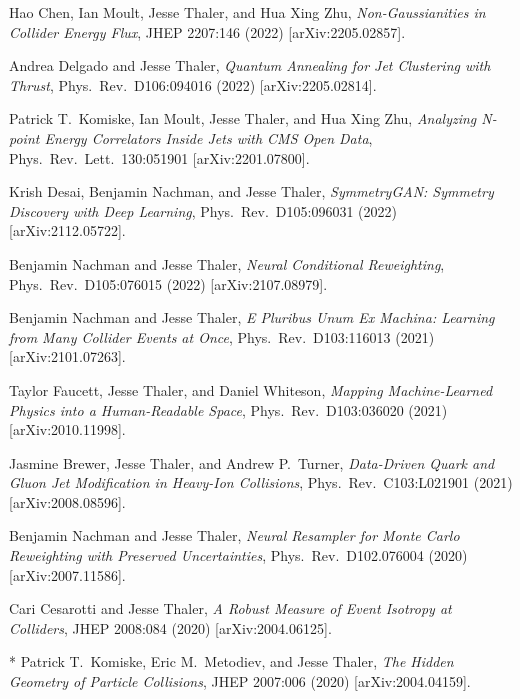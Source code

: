 \begin{list}{[]\addtocounter{jessecount}{-1}}{\leftmargin=3em \itemsep=4pt}
\item
 Hao Chen, Ian Moult, Jesse Thaler, and Hua Xing Zhu,
\emph{Non-Gaussianities in Collider Energy Flux},
JHEP 2207:146 (2022)
[arXiv:2205.02857].

\item
 Andrea Delgado and Jesse Thaler,
\emph{Quantum Annealing for Jet Clustering with Thrust},
Phys.\ Rev.\ D106:094016 (2022)
[arXiv:2205.02814].

\item
 Patrick T.\ Komiske, Ian Moult, Jesse Thaler, and Hua Xing Zhu,
\emph{Analyzing N-point Energy Correlators Inside Jets with CMS Open Data},
Phys.\ Rev.\ Lett.\ 130:051901
[arXiv:2201.07800].

\item
 Krish Desai, Benjamin Nachman, and Jesse Thaler,
\emph{SymmetryGAN: Symmetry Discovery with Deep Learning},
Phys.\ Rev.\ D105:096031 (2022)
[arXiv:2112.05722].

\item
 Benjamin Nachman and Jesse Thaler,
\emph{Neural Conditional Reweighting},
Phys.\ Rev.\ D105:076015 (2022)
[arXiv:2107.08979].

\item
 Benjamin Nachman and Jesse Thaler,
\emph{E Pluribus Unum Ex Machina: Learning from Many Collider Events at Once},
Phys.\ Rev.\ D103:116013 (2021)
[arXiv:2101.07263].

\item
 Taylor Faucett, Jesse Thaler, and Daniel Whiteson,
\emph{Mapping Machine-Learned Physics into a Human-Readable Space},
Phys.\ Rev.\ D103:036020 (2021)
[arXiv:2010.11998].

\item
 Jasmine Brewer, Jesse Thaler, and Andrew P.\ Turner,
\emph{Data-Driven Quark and Gluon Jet Modification in Heavy-Ion Collisions},
Phys.\ Rev.\ C103:L021901 (2021)
[arXiv:2008.08596].

\item
 Benjamin Nachman and Jesse Thaler,
\emph{Neural Resampler for Monte Carlo Reweighting with Preserved Uncertainties},
Phys.\ Rev.\ D102.076004 (2020)
[arXiv:2007.11586].

\item
 Cari Cesarotti and Jesse Thaler,
\emph{A Robust Measure of Event Isotropy at Colliders},
JHEP 2008:084 (2020)
[arXiv:2004.06125].

\item
* Patrick T.\ Komiske, Eric M.\ Metodiev, and Jesse Thaler,
\emph{The Hidden Geometry of Particle Collisions},
JHEP 2007:006 (2020)
[arXiv:2004.04159].


\end{list}
